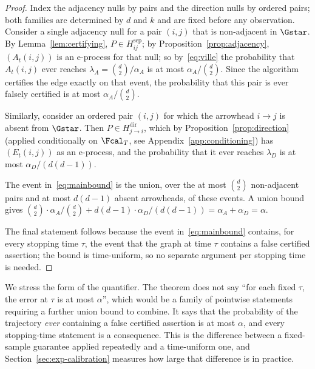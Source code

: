 \begin{proof}
Index the adjacency nulls by pairs and the direction nulls by ordered pairs;
both families are determined by $d$ and $k$ and are fixed before any
observation. Consider a single adjacency null for a pair $(i,j)$ that is
non-adjacent in $\Gstar$. By Lemma~\ref{lem:certifying}, $P \in
H^{\mathrm{sep}}_{ij}$; by Proposition~\ref{prop:adjacency}, $(A_t(i,j))$ is
an e-process for that null; so by~\eqref{eq:ville} the probability that
$A_t(i,j)$ ever reaches $\lambda_A = \binom{d}{2}/\alpha_A$ is at most
$\alpha_A / \binom{d}{2}$. Since the algorithm certifies the edge exactly on
that event, the probability that this pair is ever falsely certified is at
most $\alpha_A/\binom{d}{2}$.

Similarly, consider an ordered pair $(i,j)$ for which the arrowhead $i \to j$
is absent from $\Gstar$. Then $P \in H^{\mathrm{dir}}_{j \to i}$, which by
Proposition~\ref{prop:direction} (applied conditionally on $\Fcal_T$, see
Appendix~\ref{app:conditioning}) has $(E_t(i,j))$ as an e-process, and the
probability that it ever reaches $\lambda_D$ is at most
$\alpha_D / (d(d-1))$.

The event in~\eqref{eq:mainbound} is the union, over the at most
$\binom{d}{2}$ non-adjacent pairs and at most $d(d-1)$ absent arrowheads, of
these events. A union bound gives
$\binom{d}{2} \cdot \alpha_A/\binom{d}{2} + d(d-1) \cdot \alpha_D/(d(d-1))
= \alpha_A + \alpha_D = \alpha$.

The final statement follows because the event in~\eqref{eq:mainbound}
contains, for every stopping time $\tau$, the event that the graph at time
$\tau$ contains a false certified assertion; the bound is time-uniform, so no
separate argument per stopping time is needed.
\end{proof}

We stress the form of the quantifier. The theorem does not say ``for each
fixed $\tau$, the error at $\tau$ is at most $\alpha$'', which would be a
family of pointwise statements requiring a further union bound to combine.
It says that the probability of the trajectory \emph{ever} containing a false
certified assertion is at most $\alpha$, and every stopping-time statement is
a consequence. This is the difference between a fixed-sample guarantee applied
repeatedly and a time-uniform one, and Section~\ref{sec:exp-calibration}
measures how large that difference is in practice.

